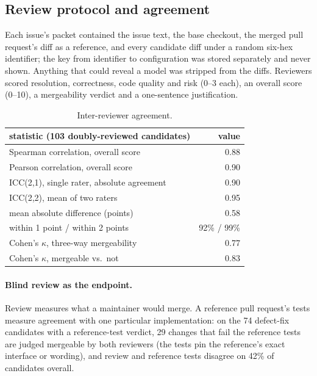 \documentclass[11pt,a4paper]{article}
\theoremstyle{definition}
\theoremstyle{remark}
\theoremstyle{definition}
\begin{document}
{\scriptsize\setlength{\tabcolsep}{4pt}
}

\clearpage
\subsection{Review protocol and agreement}
\label{app:review}
Each issue's packet contained the issue text, the base checkout, the merged pull request's diff as a reference, and every candidate diff under a random six-hex identifier; the key from identifier to configuration was stored separately and never shown. Anything that could reveal a model was stripped from the diffs. Reviewers scored resolution, correctness, code quality and risk (0--3 each), an overall score (0--10), a mergeability verdict and a one-sentence justification.

\begin{table}[h]
\centering\small
\begin{tabular}{lr}\toprule
statistic (103 doubly-reviewed candidates) & value\\\midrule
Spearman correlation, overall score & 0.88\\
Pearson correlation, overall score & 0.90\\
ICC(2,1), single rater, absolute agreement & 0.90\\
ICC(2,2), mean of two raters & 0.95\\
mean absolute difference (points) & 0.58\\
within 1 point / within 2 points & 92\% / 99\%\\
Cohen's $\kappa$, three-way mergeability & 0.77\\
Cohen's $\kappa$, mergeable vs.\ not & 0.83\\
\bottomrule\end{tabular}
\caption{Inter-reviewer agreement.}
\end{table}

\paragraph{Blind review as the endpoint.} Review measures what a maintainer would merge. A reference pull request's tests measure agreement with one particular implementation: on the 74 defect-fix candidates with a reference-test verdict, 29 changes that fail the reference tests are judged mergeable by both reviewers (the tests pin the reference's exact interface or wording), and review and reference tests disagree on 42\% of candidates overall.
\end{document}
